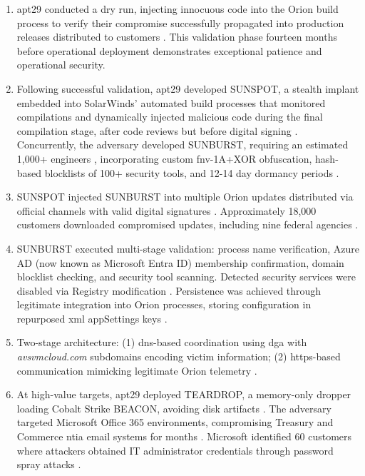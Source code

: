 \begin{enumerate}
    \item {} \gls{apt}29 conducted a dry run, injecting innocuous code into the Orion build process to verify their compromise successfully propagated into production releases distributed to customers \cite{us_open_2021}. This validation phase fourteen months before operational deployment demonstrates exceptional patience and operational security.
    \item {} Following successful validation, \gls{apt}29 developed SUNSPOT, a stealth implant embedded into SolarWinds' automated build processes that monitored compilations and dynamically injected malicious code during the final compilation stage, after code reviews but before digital signing \cite{crowdstrike_sunspot_2021, us_open_2021}. Concurrently, the adversary developed SUNBURST, requiring an estimated 1,000+ engineers \cite{ms_analyzing_2020, nagle_solarwinds_2023}, incorporating custom \gls{fnv}-1A+XOR obfuscation, hash-based blocklists of 100+ security tools, and 12-14 day dormancy periods \cite{eckels_sunburst_2020}.
    \item {} SUNSPOT injected SUNBURST into multiple Orion updates distributed via official channels with valid digital signatures \cite{mandiant_highly_2020}. Approximately 18,000 customers downloaded compromised updates, including nine federal agencies \cite{us_open_2021}.
    \item {} SUNBURST executed multi-stage validation: process name verification, Azure AD (now known as Microsoft Entra ID) membership confirmation, domain blocklist checking, and security tool scanning. Detected security services were disabled via Registry modification \cite{eckels_sunburst_2020}. Persistence was achieved through legitimate integration into Orion processes, storing configuration in repurposed \gls{xml} appSettings keys \cite{mandiant_highly_2020}.
    \item {} Two-stage architecture: (1) \gls{dns}-based coordination using \gls{dga} with \textit{avsvmcloud.com} subdomains encoding victim information; (2) \gls{https}-based communication mimicking legitimate Orion telemetry \cite{eckels_sunburst_2020, mandiant_highly_2020}.
    \item {} At high-value targets, \gls{apt}29 deployed TEARDROP, a memory-only dropper loading Cobalt Strike BEACON, avoiding disk artifacts \cite{mandiant_highly_2020}. The adversary targeted Microsoft Office 365 environments, compromising Treasury and Commerce \gls{ntia} email systems for months \cite{nagle_solarwinds_2023}. Microsoft identified 60 customers where attackers obtained IT administrator credentials through password spray attacks \cite{us_open_2021}.
\end{enumerate}

